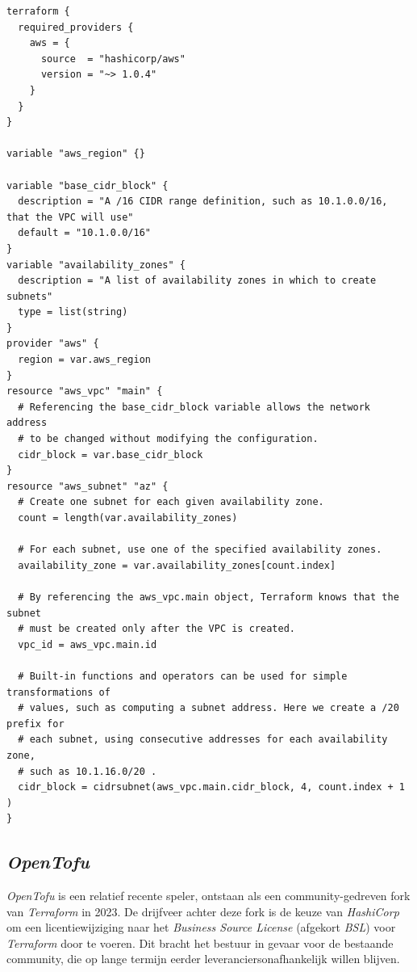 \begin{codeblock}
  \begin{verbatim}
terraform {
  required_providers {
    aws = {
      source  = "hashicorp/aws"
      version = "~> 1.0.4"
    }
  }
}

variable "aws_region" {}

variable "base_cidr_block" {
  description = "A /16 CIDR range definition, such as 10.1.0.0/16, that the VPC will use"
  default = "10.1.0.0/16"
}
variable "availability_zones" {
  description = "A list of availability zones in which to create subnets"
  type = list(string)
}
provider "aws" {
  region = var.aws_region
}
resource "aws_vpc" "main" {
  # Referencing the base_cidr_block variable allows the network address
  # to be changed without modifying the configuration.
  cidr_block = var.base_cidr_block
}
resource "aws_subnet" "az" {
  # Create one subnet for each given availability zone.
  count = length(var.availability_zones)

  # For each subnet, use one of the specified availability zones.
  availability_zone = var.availability_zones[count.index]

  # By referencing the aws_vpc.main object, Terraform knows that the subnet
  # must be created only after the VPC is created.
  vpc_id = aws_vpc.main.id

  # Built-in functions and operators can be used for simple transformations of
  # values, such as computing a subnet address. Here we create a /20 prefix for
  # each subnet, using consecutive addresses for each availability zone,
  # such as 10.1.16.0/20 .
  cidr_block = cidrsubnet(aws_vpc.main.cidr_block, 4, count.index + 1 )
}
\end{verbatim}
  \caption[Voorbeeld \emph{Terraform}-configuratie]{Voorbeeld van een eenvoudige \emph{Terraform}-configuratie \autocite{HashiCorp2025}.}
  \label{code:terraform_vb}
\end{codeblock}

\subsection{\emph{OpenTofu}}%

\emph{OpenTofu} is een relatief recente speler, ontstaan als een community-gedreven fork van \emph{Terraform} in 2023. De drijfveer achter deze fork is de keuze van \emph{HashiCorp} om een licentiewijziging naar het \emph{Business Source License} (afgekort \emph{BSL}) voor \emph{Terraform} door te voeren. Dit bracht het bestuur in gevaar voor de bestaande community, die op lange termijn eerder leveranciersonafhankelijk willen blijven. \autocite{Gaddam2023}

